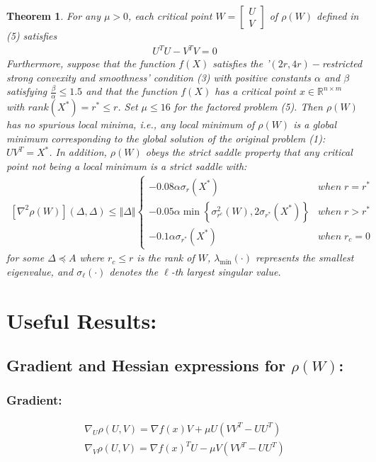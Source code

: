 \documentclass{article}
\newtheorem{theorem}{Theorem}
\begin{document}
\begin{theorem}
For any $\mu > 0$, each critical point $W=\left[\begin{array}{c}
U\\
V
\end{array}\right]$ of $\rho(W)$ defined in (5) satisfies 
\begin{align}
    U^TU-V^TV=0
\end{align}
Furthermore, suppose that the function $f(X)$ satisfies the '$(2r, 4r)-$restricted strong convexity and smoothness' condition (3) with positive constants $\alpha$ and $\beta$ satisfying $\frac{\beta}{\alpha} \le 1.5$ and that the function $f(X)$ has a critical point $x\in \mathbb{R}^{n\times m}$ with $rank(X^*) = r^* \le r$. Set $\mu \le 16$ for the factored problem (5). Then $\rho(W)$ has no spurious local minima, i.e., any local
minimum of $\rho(W)$ is a global minimum corresponding to the global solution of the original problem (1): $UV^T = X^*$. In addition, $\rho(W)$ obeys the strict saddle property that any critical point not being a local minimum is a strict saddle with:
\begin{align}
        \left[\nabla^{2}\rho\left(W\right)\right]\left(\Delta,\Delta\right)\le\left\Vert\Delta\right\Vert\begin{cases}
-0.08\alpha\sigma_r\left(X^{*}\right) & when\;r=r^{*}\\
-0.05\alpha\min\left\{ \sigma^2_{r^c}\left(W\right),2\sigma_{r^*}\left(X^{*}\right)\right\}  & when\;r> r^{*}\\
-0.1\alpha\sigma_{r^*}\left(X^{*}\right) & when\;r_c=0
\end{cases}
\end{align}
for some $\Delta\preceq A$ where $r_c \le r$ is the rank of $W$, $\lambda_{\min}\left(\cdot\right)$ represents the smallest eigenvalue, and $\sigma_{\ell}\left(\cdot\right)$ denotes the $\ell$-th largest singular value.

\end{theorem}


\section{Useful Results:}

\subsection{Gradient and Hessian expressions for $\rho\left(W\right)$:}

\subsubsection{Gradient:}
\begin{align*}
    \nabla_U\rho\left(U,V\right)=\nabla f\left(x\right)V+\mu U\left(VV^T-UU^T\right)\\
    \nabla_V\rho\left(U,V\right)=\nabla f\left(x\right)^TU-\mu V\left(VV^T-UU^T\right)
\end{align*}
\end{document}

